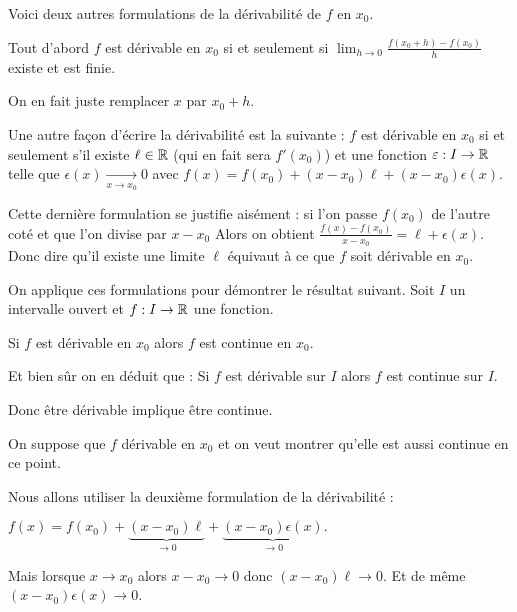 Voici deux autres formulations de la dérivabilité de $f$ en $x_0$.



Tout d'abord $f$ est dérivable en $x_0$ si et seulement si 
$\displaystyle \lim_{h\to 0} \frac{f(x_0+h)-f(x_0)}{h}$ existe et est finie.

On en fait juste remplacer $x$ par $x_0+h$.

\change

Une autre façon d'écrire la dérivabilité est la suivante :
$f$ est dérivable en $x_0$ si et seulement s'il existe $\ell \in \mathbb{R}$ (qui en fait sera $f'(x_0)$)
et une fonction $\varepsilon : I \to \mathbb{R}$ telle que $\epsilon(x) \xrightarrow[x\to x_0]{} 0$ avec
$f(x)=f(x_0)+(x-x_0) \ell + (x-x_0) \epsilon(x).$

\change


Cette dernière formulation se justifie aisément :
si l'on passe $f(x_0)$ de l'autre coté et que l'on divise par $x-x_0$
Alors on obtient 
$\frac{f(x)-f(x_0)}{x-x_0} = \ell + \epsilon(x).$
Donc dire qu'il existe une limite $\ell$ équivaut à ce que $f$ soit dérivable en $x_0$.


\diapo



On applique ces formulations pour démontrer le résultat suivant.
Soit $I$ un intervalle ouvert et $f : I \to \mathbb{R}$ une fonction.

\change

Si $f$ est dérivable en $x_0$ alors $f$ est continue en $x_0$.

\change

Et bien sûr on en déduit que : Si $f$ est dérivable sur $I$ alors $f$ est continue sur $I$.

Donc être dérivable implique être continue.

\change



On suppose que $f$ dérivable en $x_0$ et on veut montrer qu'elle est aussi continue en ce point.

Nous allons utiliser la deuxième formulation de la dérivabilité :

$f(x)= f(x_0)+\underbrace{(x-x_0) \ell}_{\to 0} + \underbrace{(x-x_0) \epsilon(x)}_{\to 0}.$

\change

Mais lorsque $x\to x_0$ alors $x-x_0\to 0$ donc $(x-x_0) \ell \to 0$.
Et de même $(x-x_0) \epsilon(x)\to 0$.

\change

